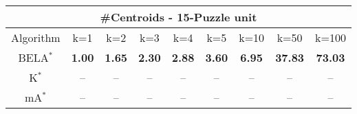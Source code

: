 \begin{tabular}{c|cccccccc}\toprule
\multicolumn{9}{c}{#Centroids - 15-Puzzle unit}\\ \midrule
Algorithm & k=1 & k=2 & k=3 & k=4 & k=5 & k=10 & k=50 & k=100 \\ \midrule
BELA$^*$ & \textbf{1.00} & \textbf{1.65} & \textbf{2.30} & \textbf{2.88} & \textbf{3.60} & \textbf{6.95} & \textbf{37.83} & \textbf{73.03} \\
K$^*$ & -- & -- & -- & -- & -- & -- & -- & -- \\
mA$^*$ & -- & -- & -- & -- & -- & -- & -- & -- \\ \bottomrule 
\end{tabular}
